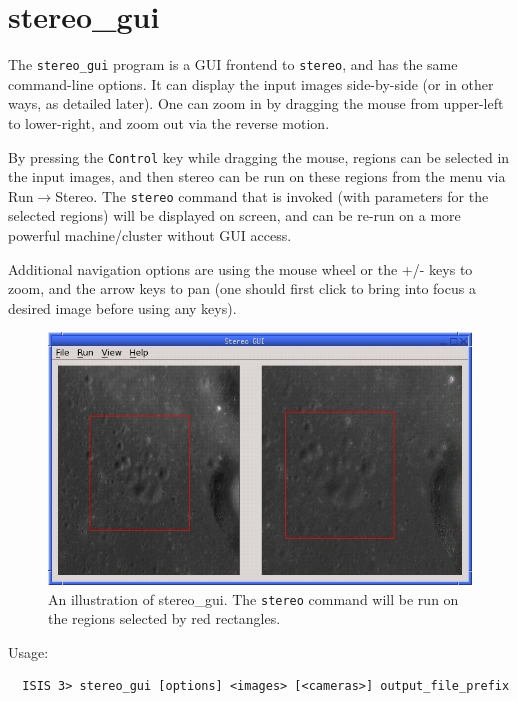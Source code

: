 \section{stereo\_gui}
\label{stereo_gui}

The \texttt{stereo\_gui} program is a GUI frontend to \texttt{stereo},
and has the same command-line options. It can display the input images
side-by-side (or in other ways, as detailed later). One can zoom in by
dragging the mouse from upper-left to lower-right, and zoom out via the
reverse motion.

By pressing the \texttt{Control} key while dragging the mouse, regions
can be selected in the input images, and then stereo can be run on these
regions from the menu via Run$\rightarrow$Stereo. The \texttt{stereo}
command that is invoked (with parameters for the selected regions) will
be displayed on screen, and can be re-run on a more powerful
machine/cluster without GUI access.

Additional navigation options are using the mouse wheel or the +/- keys to
zoom, and the arrow keys to pan (one should first click to bring into
focus a desired image before using any keys).

\begin{figure}[h!]
\begin{center}
\includegraphics[width=5in]{images/stereo_gui.jpg}
\caption[asp\_gui]{An illustration of stereo\_gui. The \texttt{stereo} command
will be run on the regions selected by red rectangles.}
\label{asp_gui_fig}
\end{center}
\end{figure}

Usage:
\begin{verbatim}
  ISIS 3> stereo_gui [options] <images> [<cameras>] output_file_prefix
\end{verbatim}

